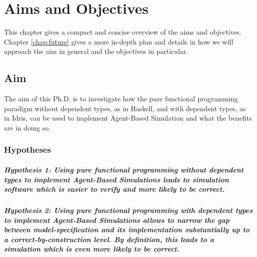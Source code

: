 \chapter{Aims and Objectives}
\label{chap:aimsObj}

This chapter gives a compact and concise overview of the aims and objectives. Chapter \ref{chap:future} gives a more in-depth plan and details in how we will approach the aim in general and the objectives in particular.

\section{Aim}
The aim of this Ph.D. is to investigate how the pure functional programming paradigm without dependent types, as in Haskell, and with dependent types, as in Idris, can be used to implement Agent-Based Simulation and what the benefits are in doing so.

\subsection{Hypotheses}
\paragraph{Hypothesis 1: Using pure functional programming without dependent types to implement Agent-Based Simulations leads to simulation software which is easier to verify and more likely to be correct.}

\paragraph{Hypothesis 2: Using pure functional programming with dependent types to implement Agent-Based Simulations allows to narrow the gap between model-specification and its implementation substantially up to a correct-by-construction level. By definition, this leads to a simulation which is even more likely to be correct.}

